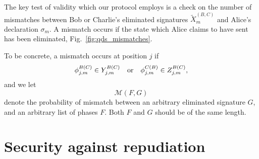 The key test of validity which our protocol employs is a check on the number of mismatches between Bob or Charlie's eliminated signatures $\tilde{X}^{\left(B, C\right)}_m$ and Alice's declaration $\sigma_m$. A mismatch occurs if the state which Alice claims to have sent has been eliminated, Fig.~\ref{fig:qds_mismatches}. 

To be concrete, a mismatch occurs at position $j$ if
\begin{equation}
\phi_{j, m}^{B \left(C\right)} \in Y_{j, m}^{B \left(C\right)} \qq{or} \phi_{j, m}^{C \left(B\right)} \in Z_{j, m}^{B \left(C\right)}, 
\end{equation}
and we let
\begin{equation}
\mathcal{M}\left(F, G\right)
\end{equation}
denote the probability of mismatch between an arbitrary eliminated signature $G$, and an arbitrary list of phases $F$. Both $F$ and $G$ should be of the same length.




\section{Security against repudiation}\label{sec:qds_security_repudiation}
\iffalse
In other words at the end of Step~$3$, having sent the state $\ket{\phi_{j, m}^B}\bra{\phi_{j, m}^B}$ to Bob, Alice knows that Bob holds the corresponding eliminated signature element $X_{j, m}^B$. Since Alice knows which state she sent to Bob, she may be able to guess Bob's eliminated signature element with some probability. 

 At the end of Step~$4$ however, Alice does not know whether it is Bob or Charlie who holds $X_{j, m}^B$. This uncertainty will prove crucial for preventing her from successfully repudiating (Requirement~$3$). Bob (and Charlie) now possesses an eliminated signature $\tilde{X}_m^{\left(B\right)}$ in two halves: one half ($Y_m^{\left(B\right)}$) containing those elements received directly from Alice, and one half ($Z_m^{\left(B\right)}$)containing elements received during this Symmetrization step from Charlie.
 \fi


